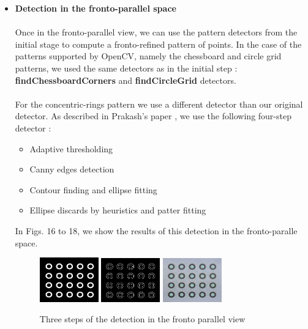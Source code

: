 \documentclass[journal]{IEEEtran}
\begin{document}
\begin{itemize}
    \item \textbf{Detection in the fronto-parallel space}
        \\
        \\
        Once in the fronto-parallel view, we can use the pattern detectors from the initial stage to compute a fronto-refined pattern of points. In the case of the patterns supported by OpenCV, namely the chessboard and circle grid patterns, we used the same detectors as in the initial step : \textbf{findChessboardCorners} and \textbf{findCircleGrid} detectors.
        \\
        \\
        For the concentric-rings pattern we use a different detector than our original detector. As described in Prakash's paper \cite{Prakash2012}, we use the following four-step detector :

        \begin{itemize}

            \item Adaptive thresholding
            \item Canny edges detection
            \item Contour finding and ellipse fitting
            \item Ellipse discards by heuristics and patter fitting

        \end{itemize}

        In Figs. 16 to 18, we show the results of this detection in the fronto-paralle space.

        \begin{figure}[H]
        \centering
        \includegraphics[width=1.0in]{_img/report_4/img_refinement_fronto_detection_mask.png}
        \includegraphics[width=1.0in]{_img/report_4/img_refinement_fronto_detection_edges.png}
        \includegraphics[width=1.0in]{_img/report_4/img_refinement_detection_features.png}
        \caption{Three steps of the detection in the fronto parallel view}
        \end{figure}


\end{itemize}
\end{document}
